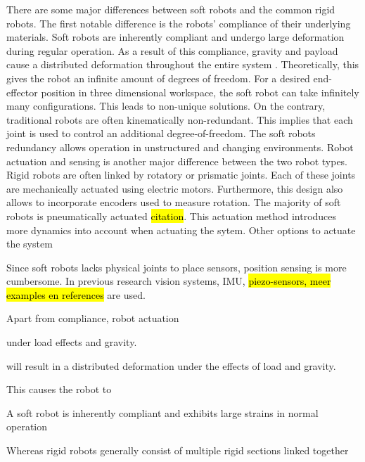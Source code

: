 There are some major differences between soft robots and the common rigid robots. The first notable difference is the robots' compliance of their underlying materials. Soft robots are inherently compliant and undergo large deformation during regular operation. As a result of this compliance, gravity and payload cause a distributed deformation throughout the entire system \cite{trivedi2008soft}. Theoretically, this gives the robot an infinite amount of degrees of freedom. For a desired end-effector position in three dimensional workspace, the soft robot can take infinitely many configurations. This leads to non-unique solutions. On the contrary, traditional robots are often kinematically non-redundant. This implies that each joint is used to control an additional degree-of-freedom. The soft robots redundancy allows operation in unstructured and changing environments. Robot actuation and sensing is another major difference between the two robot types. Rigid robots are often linked by rotatory or prismatic joints. Each of these joints are mechanically actuated using electric motors. Furthermore, this design also allows to incorporate encoders used to measure rotation. The majority of soft robots is pneumatically actuated \hl{citation}. This actuation method introduces more dynamics into account when actuating the sytem. Other options to actuate the system 

Since soft robots lacks physical joints to place sensors, position sensing is more cumbersome. In previous research vision systems, IMU, \hl{piezo-sensors, meer examples en references} are used. 

Apart from compliance, robot actuation 


under load effects and gravity.  

will result in a distributed deformation under the effects of load and gravity. 

This causes the robot to 

A soft robot is inherently compliant and exhibits
large strains in normal operation

Whereas rigid robots generally consist of multiple rigid sections linked together

